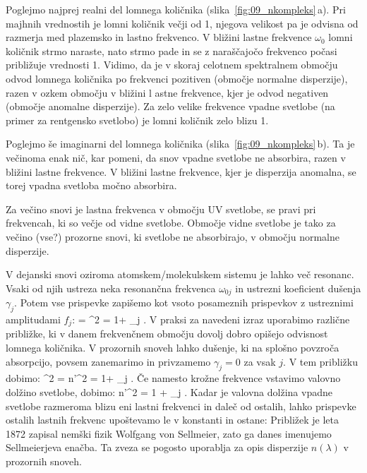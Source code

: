 Poglejmo najprej realni del lomnega količnika (slika~\ref{fig:09_nkompleks}\,a). Pri majhnih vrednostih
je lomni količnik večji od 1, njegova velikost pa je odvisna od razmerja med plazemsko in lastno frekvenco.
V bližini lastne frekvence $\omega_0$ lomni količnik strmo naraste, nato strmo pade in se z naraščajočo
frekvenco počasi približuje vrednosti 1. Vidimo, da je v skoraj celotnem spektralnem območju odvod
lomnega količnika po frekvenci pozitiven (območje normalne disperzije), razen v ozkem območju v bližini l
astne frekvence, kjer je odvod negativen (območje anomalne disperzije). Za zelo velike frekvence vpadne
svetlobe (na primer za rentgensko svetlobo) je lomni količnik zelo blizu 1.

Poglejmo še imaginarni del lomnega količnika (slika~\ref{fig:09_nkompleks}\,b). Ta je večinoma enak nič,
kar pomeni, da snov vpadne svetlobe ne absorbira, razen v bližini lastne frekvence. V bližini 
lastne frekvence, kjer je disperzija anomalna, se torej vpadna svetloba močno absorbira. 

Za večino snovi je lastna frekvenca v območju UV svetlobe, se pravi pri frekvencah, ki 
so večje od vidne svetlobe. Območje vidne svetlobe je tako za večino (vse?) prozorne snovi,
ki svetlobe ne absorbirajo, v območju normalne disperzije. 

V dejanski snovi oziroma atomskem/molekulskem sistemu je lahko več resonanc. Vsaki
od njih ustreza neka resonančna frekvenca $\omega_{0j}$ in ustrezni koeficient
dušenja $\gamma_j$. Potem vse prispevke zapišemo kot vsoto posameznih prispevkov 
z ustreznimi amplitudami $f_j$:
\beq
\varepsilon = ^2 = 1+ \sum_j .
\label{eq:09_27}
\eeq
V praksi za navedeni izraz uporabimo različne približke, ki v danem frekvenčnem
območju dovolj dobro opišejo odvisnost lomnega količnika. V prozornih snoveh lahko 
dušenje, ki na splošno povzroča absorpcijo, povsem zanemarimo in privzamemo $\gamma_j = 0$ za 
vsak $j$. V tem približku dobimo:
\beq
{}^2 = n'^2 = 1+ \sum_j .
\label{eq:09_28}
\eeq
Če namesto krožne frekvence vstavimo valovno dolžino svetlobe, dobimo:
\beq
n'^2 = 1 + \sum_j .
\label{eq:09_29}
\eeq
Kadar je valovna dolžina vpadne svetlobe razmeroma blizu eni lastni frekvenci in daleč
od ostalih, lahko prispevke ostalih lastnih frekvenc upoštevamo le v konstanti in ostane:
Približek je leta 1872 zapisal nemški fizik Wolfgang von Sellmeier, zato ga danes
imenujemo Sellmeierjeva enačba. Ta zveza se pogosto uporablja za opis disperzije $n(\lambda)$
v prozornih snoveh. 

